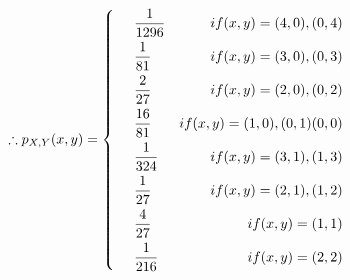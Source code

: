 \documentclass[dvipdfmx,uplatex]{jsarticle}
\begin{document}
    \begin{equation}
        \therefore {p}_{X,Y}(x,y) = 
            \left \{
                \begin{aligned}
                    &\hspace{5mm} \frac{1}{1296} &if(x,y)=(4,0),(0,4) \\
                    &\hspace{5mm} \frac{1}{81} &if(x,y)=(3,0),(0,3) \\
                    &\hspace{5mm} \frac{2}{27} &if(x,y)=(2,0),(0,2) \\
                    &\hspace{5mm} \frac{16}{81} &if(x,y)=(1,0),(0,1)(0,0) \\
                    &\hspace{5mm} \frac{1}{324} &if(x,y)=(3,1),(1,3) \\
                    &\hspace{5mm} \frac{1}{27} &if(x,y)=(2,1),(1,2) \\
                    &\hspace{5mm} \frac{4}{27} &if(x,y)=(1,1) \\
                    &\hspace{5mm} \frac{1}{216} &if(x,y)=(2,2) \\
                \end{aligned}
            \right. \nonumber
    \end{equation}
\end{document}
